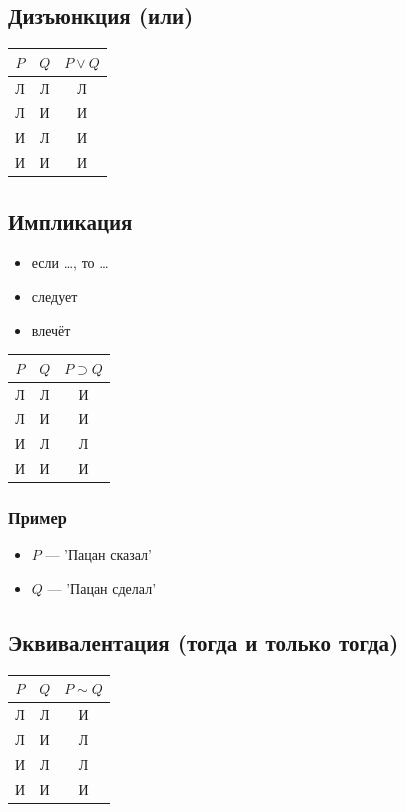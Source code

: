 \documentclass{article}
\begin{document}
\subsection{Дизъюнкция (или)}
\begin{tabular}{c|c|c}
    $P$ & $Q$ & $P \vee Q$ \\
    \hline
    Л & Л & Л \\
    Л & И & И \\
    И & Л & И \\
    И & И & И
\end{tabular}


\subsection{Импликация}
\begin{itemize}
    \item если \dots, то \dots
    \item следует
    \item влечёт
\end{itemize}
\begin{tabular}{c|c|c}
    $P$ & $Q$ & $P \supset Q$ \\
    \hline
    Л & Л & И \\
    Л & И & И \\
    И & Л & Л \\
    И & И & И
\end{tabular}

\subsubsection{Пример}
\begin{itemize}
    \item $P$ --- 'Пацан сказал'
    \item $Q$ --- 'Пацан сделал'
\end{itemize}


\subsection{Эквивалентация (тогда и только тогда)}
\begin{tabular}{c|c|c}
    $P$ & $Q$ & $P \sim Q$ \\
    \hline
    Л & Л & И \\
    Л & И & Л \\
    И & Л & Л \\
    И & И & И
\end{tabular}
\end{document}
